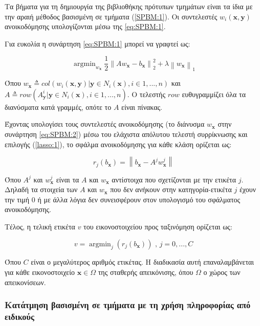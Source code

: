 \documentclass[a4paper,12pt]{article}
\newcommand{\argminB}{\mathop{\mathrm{argmin}}}
\newcommand\norm[1]{\left\lVert#1\right\rVert}
\begin{document}
Τα βήματα για τη δημιουργία της βιβλιοθήκης πρότυπων τμημάτων είναι τα ίδια με
την αραιή μέθοδος βασισμένη σε τμήματα (\ref{SPBM:1}). Οι συντελεστές
$w_i(\bm{x},\bm{y})$ ανοικοδόμησης υπολογίζονται μέσω της \eqref{eq:SPBM:1}.

Για ευκολία η συνάρτηση \eqref{eq:SPBM:1} μπορεί να γραφτεί ως:

\begin{equation} \label{eq:SPBM:2}
    \argminB_{w_{\bm{x}}} { \frac{1} {2} \norm { A w_{\bm{x}} - b_{\bm{x}} }_2^2
              + \lambda \norm{w_{\bm{x}}}_1 }
\end{equation}

Όπου $w_{\bm{x}} \triangleq col( w_i( \bm{x}, \bm{y}) | \bm{y} \in N_i( \bm{x}),
i \in {{1,...,n}})$ και \\
$A \triangleq row( {{A_{\bm{y}}^i | \bm{y} \in N_i(\bm{x}), i \in {{1,...,n}}
}})$. Ο τελεστής $row$ ευθυγραμμίζει όλα τα διανύσματα κατά γραμμές, οπότε το
$A$ είναι πίνακας.

Έχοντας υπολογίσει τους συντελεστές ανοικοδόμησης (το διάνυσμα $w_{\bm{x}}$ στην
συνάρτηση \eqref{eq:SPBM:2}) μέσω του ελάχιστα απόλυτου τελεστή συρρίκνωσης και
επιλογής (\ref{lasso:1}), το σφάλμα ανοικοδόμησης για κάθε κλάση ορίζεται ως:

\begin{equation} 
    r_j(b_{\bm{x}}) = \norm{ b_{\bm{x}} - A^j w_{\bm{x}}^j }
\end{equation}

Όπου $A^j$ και $w_{\bm{x}}^j$ είναι τα $A$ και $w_{\bm{x}}$ αντίστοιχα που
σχετίζονται με την ετικέτα $j$. Δηλαδή τα στοιχεία των $A$ και $w_{\bm{x}}$ που
δεν ανήκουν στην κατηγορία-ετικέτα $j$ έχουν την τιμή $0$ ή με άλλα λόγια δεν
συνεισφέρουν στον υπολογισμό του σφάλματος ανοικοδόμησης.

Τέλος, η τελική ετικέτα $v$ του εικονοστοιχείου προς ταξινόμηση ορίζεται ως:

\begin{equation*} 
    v = \argminB_{j} { \left( r_j(b_{\bm{x}}) \right) } \text{ , } j = 0,...,C
\end{equation*}

Όπου $C$ είναι ο μεγαλύτερος αριθμός ετικέτας. Η διαδικασία αυτή επαναλαμβάνεται
για κάθε εικονοστοιχείο $\bm{x} \in \Omega$ της σταθερής απεικόνισης, όπου
$\Omega$ ο χώρος των απεικονίσεων.


\subsubsection{Κατάτμηση βασισμένη σε τμήματα με τη χρήση πληροφορίας από
ειδικούς}
\end{document}
